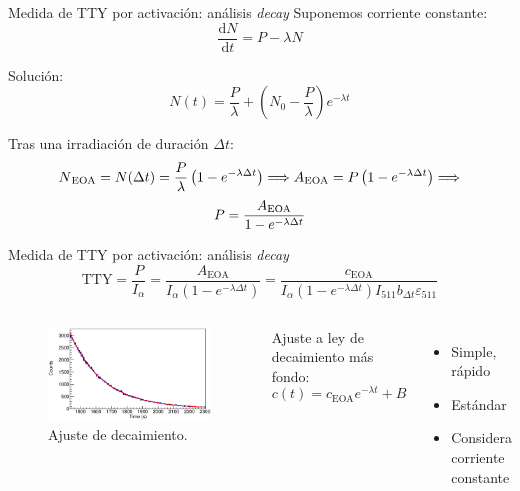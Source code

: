 \documentclass[11pt]{beamer}
\newcommand{\dif}{\text{d}}
\newcommand{\ddt}[1]{\frac{\dif #1}{\dif t}}
\begin{document}
\begin{frame}{Medida de TTY por activación: análisis \textit{decay}}
	Suponemos corriente constante:
	\begin{equation}
		\ddt{N} = P -\lambda N
	\end{equation}

	Solución:
	\begin{equation}
		N(t) = \frac{P}{\lambda} + \left(  N_0 - \frac{P}{\lambda}  \right) e^{-\lambda t}
	\end{equation}

	Tras una irradiación de duración $\Delta t$:
	\[ N\textsubscript{EOA} =N(\Delta t) = \frac{P}{\lambda} \left(1 - e^{-\lambda \Delta t} \right)\Longrightarrow A\textsubscript{EOA}=P\left(1-e^{-\lambda\Delta t}\right)\Longrightarrow \]
	\begin{equation}
		P = \frac{A\textsubscript{EOA}}{1 - e^{-\lambda \Delta t}}
	\end{equation}
\end{frame}

\begin{frame}{Medida de TTY por activación: análisis \textit{decay}}
	\begin{equation}
		\text{TTY} = \frac{P}{I_\alpha} = \frac{A_\text{EOA}}{I_\alpha \left( 1-e^{-\lambda \Delta t}  \right)} = 
		\frac{c_\text{EOA}}{I_\alpha \left( 1-e^{-\lambda \Delta t}  \right) I_{511} b_{\Delta t} \varepsilon_{511}  }
	\end{equation}
	\begin{columns}
	\begin{figure}[H]
		\centering
		\includegraphics[width=\textwidth]{example_decay_fit.eps}
		\caption{Ajuste de decaimiento.}
		\label{decay_fit}
	\end{figure}
	Ajuste a ley de decaimiento más fondo:
	\begin{equation}
		c(t) = c_\text{EOA} e^{-\lambda t} + B
	\end{equation}
	\begin{itemize}
		\item Simple, rápido
		\item Estándar
		\item Considera corriente constante
	\end{itemize}
	\end{columns}
\end{frame}
\end{document}
